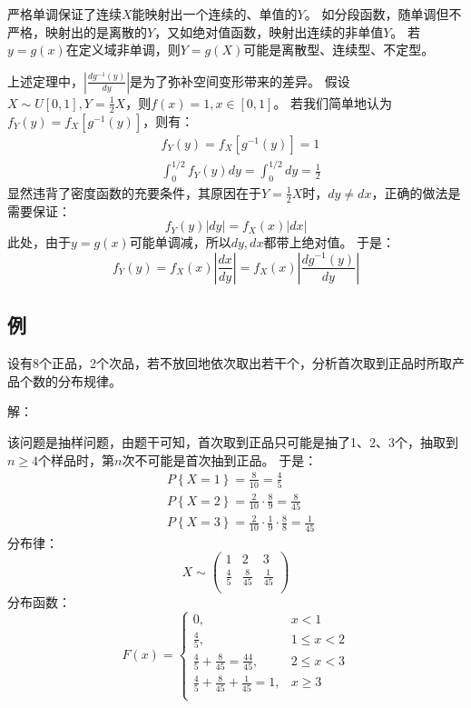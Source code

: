 严格单调保证了连续$X$能映射出一个连续的、单值的$Y$。
如分段函数，随单调但不严格，映射出的是离散的$Y$，又如绝对值函数，映射出连续的非单值$Y$。
若$y=g\left( x \right) $在定义域非单调，则$Y=g\left( X \right) $可能是离散型、连续型、不定型。

上述定理中，$\left| \frac{dg^{-1}\left( y \right)}{dy} \right|$是为了弥补空间变形带来的差异。
假设$X\sim U\left[ 0,1 \right] ,Y=\frac{1}{2}X$，则$f\left( x \right) =1,x\in \left[ 0,1 \right] $。
若我们简单地认为$f_Y\left( y \right) =f_X\left[ g^{-1}\left( y \right) \right] $，则有：
\begin{align*}
&f_Y\left( y \right) =f_X\left[ g^{-1}\left( y \right) \right] =1 \\
&\int_0^{1/2}{f_Y\left( y \right) dy}=\int_0^{1/2}{dy}=\frac{1}{2}
\end{align*}
显然违背了密度函数的充要条件，其原因在于$Y=\frac{1}{2}X$时，$dy\ne dx$，正确的做法是需要保证：
\[
f_Y\left( y \right) \left| dy \right|=f_X\left( x \right) \left| dx \right|
\]
此处，由于$y=g\left( x \right) $可能单调减，所以$dy,dx$都带上绝对值。
于是：
\[
f_Y\left( y \right) =f_X\left( x \right) \left| \frac{dx}{dy} \right|=f_X\left( x \right) \left| \frac{dg^{-1}\left( y \right)}{dy} \right|
\]


\subsection{例}

\begin{example}
设有8个正品，2个次品，若不放回地依次取出若干个，分析首次取到正品时所取产品个数的分布规律。
\end{example}

解：

该问题是抽样问题，由题干可知，首次取到正品只可能是抽了1、2、3个，抽取到$n\geqslant 4$个样品时，第$n$次不可能是首次抽到正品。
于是：
\begin{align*}
&P\left\{ X=1 \right\} =\frac{8}{10}=\frac{4}{5} \\
&P\left\{ X=2 \right\} =\frac{2}{10}\cdot \frac{8}{9}=\frac{8}{45} \\
&P\left\{ X=3 \right\} =\frac{2}{10}\cdot \frac{1}{9}\cdot \frac{8}{8}=\frac{1}{45}
\end{align*}
分布律：
\[
X\sim \left( \begin{matrix}
	1&		2&		3\\
	\frac{4}{5}&		\frac{8}{45}&		\frac{1}{45}\\
\end{matrix} \right)
\]
分布函数：
\[
F\left( x \right) =\begin{cases}
	0,&		x<1\\
	\frac{4}{5},&		1\leqslant x<2\\
	\frac{4}{5}+\frac{8}{45}=\frac{44}{45},&		2\leqslant x<3\\
	\frac{4}{5}+\frac{8}{45}+\frac{1}{45}=1,&		x\geqslant 3\\
\end{cases}
\]

